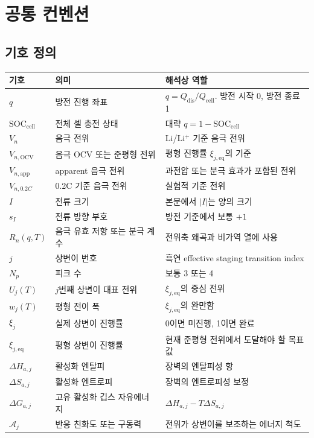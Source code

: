 \documentclass[11pt,a4paper]{article}
\newcommand{\OCV}{\mathrm{OCV}}
\newcommand{\app}{\mathrm{app}}
\newcommand{\eq}{\mathrm{eq}}
\newcommand{\cell}{\mathrm{cell}}
\newcommand{\dis}{\mathrm{dis}}
\newcommand{\SOC}{\mathrm{SOC}}
\begin{document}
\section{공통 컨벤션}
\subsection{기호 정의}
\begin{longtable}{p{}p{}p{}}
\toprule
기호 & 의미 & 해석상 역할 \\
\midrule
\endhead
\(q\) & 방전 진행 좌표 & \(q=Q_{\dis}/Q_{\cell}\). 방전 시작 0, 방전 종료 1 \\
\(\SOC_{\cell}\) & 전체 셀 충전 상태 & 대략 \(q=1-\SOC_{\cell}\) \\
\(V_n\) & 음극 전위 & Li/Li\(^+\) 기준 음극 전위 \\
\(V_{n,\OCV}\) & 음극 OCV 또는 준평형 전위 & 평형 진행률 \(\xi_{j,\eq}\)의 기준 \\
\(V_{n,\app}\) & apparent 음극 전위 & 과전압 또는 분극 효과가 포함된 전위 \\
\(V_{n,0.2C}\) & 0.2C 기준 음극 전위 & 실험적 기준 전위 \\
\(I\) & 전류 크기 & 본문에서 \(|I|\)는 양의 크기 \\
\(s_I\) & 전류 방향 부호 & 방전 기준에서 보통 \(+1\) \\
\(R_n(q,T)\) & 음극 유효 저항 또는 분극 계수 & 전위축 왜곡과 비가역 열에 사용 \\
\(j\) & 상변이 번호 & 흑연 effective staging transition index \\
\(N_p\) & 피크 수 & 보통 3 또는 4 \\
\(U_j(T)\) & \(j\)번째 상변이 대표 전위 & \(\xi_{j,\eq}\)의 중심 전위 \\
\(w_j(T)\) & 평형 전이 폭 & \(\xi_{j,\eq}\)의 완만함 \\
\(\xi_j\) & 실제 상변이 진행률 & 0이면 미진행, 1이면 완료 \\
\(\xi_{j,\eq}\) & 평형 상변이 진행률 & 현재 준평형 전위에서 도달해야 할 목표값 \\
\(\Delta H_{a,j}\) & 활성화 엔탈피 & 장벽의 엔탈피성 항 \\
\(\Delta S_{a,j}\) & 활성화 엔트로피 & 장벽의 엔트로피성 보정 \\
\(\Delta G_{a,j}\) & 고유 활성화 깁스 자유에너지 & \(\Delta H_{a,j}-T\Delta S_{a,j}\) \\
\(\mathcal A_j\) & 반응 친화도 또는 구동력 & 전위가 상변이를 보조하는 에너지 척도 \\

\end{longtable}
\end{document}
